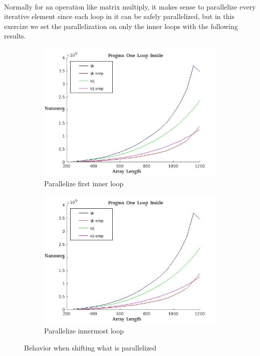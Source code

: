 \documentclass[10pt,8.5in,11in]{article}
\begin{document}
	\paragraph{}	
	Normally for an operation like matrix multiply, it makes sense to parallelize every iterative element since each loop in it can be safely parallelized, but in this exercize we set the parallelization on only the inner loops with the following results.
	
	\begin{figure}[h!]
	\centering
	\begin{subfigure}{.4\textwidth}
  		\centering
  		\includegraphics[width=\linewidth]{part3c_one}
  		\caption{Parallelize first inner loop}
	\end{subfigure}%
	\begin{subfigure}{.4\textwidth}
  		\centering
  		\includegraphics[width=\linewidth]{part3c_one}
  		\caption{Parallelize innermost loop}
	\end{subfigure}	
	\caption{Behavior when shifting what is parallelized}
	\end{figure}
	
\end{document}
